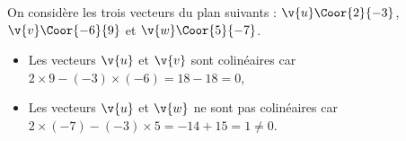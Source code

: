 
\begin{ex}{}{}
   On considère les trois vecteurs du plan suivants : $\v{u}\Coor{2}{-3}$, $\v{v}\Coor{-6}{9}$ et $\v{w}\Coor{5}{-7}$.
   \begin{itemize}
      \item  Les vecteurs $\v{u}$ et $\v{v}$ sont colinéaires car $2\times9-(-3)\times(-6)=18-18=0$,
      \item  Les vecteurs $\v{u}$ et $\v{w}$ ne sont pas colinéaires car $2\times(-7)-(-3)\times5=-14+15=1\neq0$.
   \end{itemize}
\end{ex}

